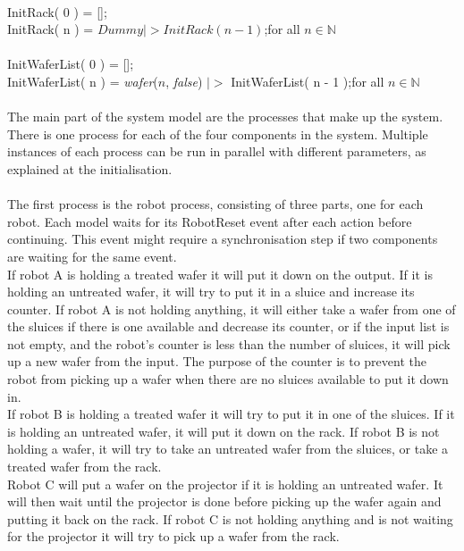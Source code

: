 \documentclass[12pt]{report}
\newcounter{counter}
\begin{document}
	\\
	\phantom{----} InitRack( 0 ) = [];\\
	\phantom{----} InitRack( n ) = $Dummy |> InitRack( n - 1 )$;\hfill for all $n \in \mathbb{N}$\\
	\\
	\phantom{----} InitWaferList( 0 ) = [];\\
	\phantom{----} InitWaferList( n ) = \emph{wafer}($n$, \emph{false}) $|>$ InitWaferList( n - 1 );\hfill for all $n \in \mathbb{N}$\\
	\\
	The main part of the system model are the processes that make up the system. There is one process for each of the four components in the system. Multiple instances of each process can be run in parallel with different parameters, as explained at the initialisation.\\
	\\%
	The first process is the robot process, consisting of three parts, one for each robot. Each model waits for its RobotReset event after each action before continuing. This event might require a synchronisation step if two components are waiting for the same event.\\
	If robot A is holding a treated wafer it will put it down on the output. If it is holding an untreated wafer, it will try to put it in a sluice and increase its counter. If robot A is not holding anything, it will either take a wafer from one of the sluices if there is one available and decrease its counter, or if the input list is not empty, and the robot's counter is less than the number of sluices, it will pick up a new wafer from the input. The purpose of the counter is to prevent the robot from picking up a wafer when there are no sluices available to put it down in.\\
	If robot B is holding a treated wafer it will try to put it in one of the sluices. If it is holding an untreated wafer, it will put it down on the rack. If robot B is not holding a wafer, it will try to take an untreated wafer from the sluices, or take a treated wafer from the rack.\\
	Robot C will put a wafer on the projector if it is holding an untreated wafer. It will then wait until the projector is done before picking up the wafer again and putting it back on the rack. If robot C is not holding anything and is not waiting for the projector it will try to pick up a wafer from the rack.\\
\end{document}
